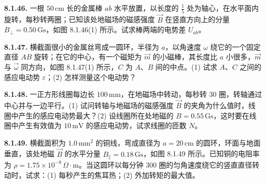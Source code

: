 \begin{center}
\end{center}

\vfill
\newpage

\textbf{8.1.46.} 一根 $50\,\mathrm{cm}$ 长的金属棒 $ab$ 水平放置，以长度的 $\displaystyle \frac{1}{5}$ 处为轴心，在水平面内旋转，每秒转两圈；已知该处地磁场的磁感强度 $\vec{B}$ 在竖直方向上的分量 $B_{\perp} = 0.50\,\mathrm{Gs}$，如图 8.1.46(1) 所示。试求棒两端的电势差 $U_{ab}$。

\begin{center}
\end{center}

\vfill
\newpage

\textbf{8.1.47.} 横截面很小的金属丝弯成一圆环，半径为 $a$，以角速度 $\omega$ 绕它的一个固定直径 $AB$ 旋转；在它的中心，有一个磁矩为 $\vec{m}$ 的小磁棒，其长度比 $a$ 小很多，$\vec{m}$ 与 $\vec{\omega}$ 同方向，如图 8.1.47(1) 所示，$C$ 为 $A$、$B$ 间的中点。(1) 试求 $A$、$C$ 之间的感应电动势 $\varepsilon$；(2) 怎样测量这个电动势？

\begin{center}
\end{center}

\vfill
\newpage

\textbf{8.1.48.} 一正方形线圈每边长 $100\,\mathrm{mm}$，在地磁场中转动，每秒转 $30$ 圈，转轴通过中心并与一边平行。(1) 试问转轴与地磁场的磁感强度 $\vec{B}$ 的夹角为什么值时，线圈中产生的感应电动势最大？(2) 设线圈所在处地磁的 $B = 0.55\,\mathrm{Gs}$，这时要在线圈中产生有效值为 $10\,\mathrm{mV}$ 的感应电动势，试求线圈的匝数 $N$。

\vfill
\newpage

\textbf{8.1.49.} 横截面积为 $1.0\,\mathrm{mm}^{2}$ 的铜线，弯成直径为 $a = 20\,\mathrm{cm}$ 的圆环，环面与地面垂直，该处地磁 $\vec{B}$ 的水平分量 $B_{\parallel} = 0.18\,\mathrm{Gs}$，如图 8.1.49 所示。已知铜的电阻率为 $\rho = 1.75 \times 10^{-8}\,\Omega\cdot\mathrm{m}$。当这圆环以每分钟 $300$ 圈的匀角速度绕它的竖直直径转动时，试求：(1) 每秒产生的焦耳热；(2) 外加转矩的最大值。

\begin{center}
\end{center}

\vfill
\newpage

